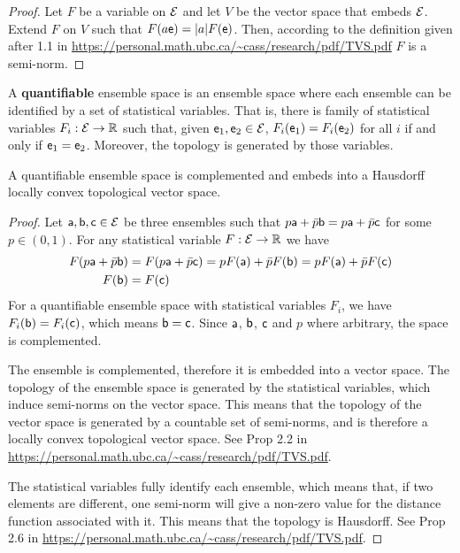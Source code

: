 \begin{proof}
	Let $F$ be a variable on $\Ens$ and let $V$ be the vector space that embeds $\Ens$. Extend $F$ on $V$ such that $F(a\ens) = |a| F(\ens)$. Then, according to the definition given after 1.1 in \url{https://personal.math.ubc.ca/~cass/research/pdf/TVS.pdf} $F$ is a semi-norm.
\end{proof}

\begin{defn}
	A \textbf{quantifiable} ensemble space is an ensemble space where each ensemble can be identified by a set of statistical variables. That is, there is family of statistical variables $F_i : \Ens \to \mathbb{R}$ such that, given $\ens_1, \ens_2 \in \Ens$, $F_i(\ens_1) = F_i(\ens_2)$ for all $i$ if and only if $\ens_1 = \ens_2$. Moreover, the topology is generated by those variables.
\end{defn}

\begin{prop}
	A quantifiable ensemble space is complemented and embeds into a Hausdorff locally convex topological vector space.
\end{prop}

\begin{proof}
	Let $\ens[a], \ens[b], \ens[c] \in \Ens$ be three ensembles such that $p \ens[a] + \bar{p} \ens[b] = p \ens[a] + \bar{p} \ens[c]$ for some $p \in (0,1)$. For any statistical variable $F : \Ens \to \mathbb{R}$ we have
	\begin{equation}
		\begin{aligned}
			F(p \ens[a] + \bar{p} \ens[b]) &= F(p \ens[a] + \bar{p} \ens[c]) = p F(\ens[a]) + \bar{p} F(\ens[b]) = p F(\ens[a]) + \bar{p} F(\ens[c])\\
			F(\ens[b]) &= F(\ens[c]) 
		\end{aligned}
	\end{equation}
	For a quantifiable ensemble space with statistical variables $F_i$, we have $F_i(\ens[b]) = F_i(\ens[c])$, which means $\ens[b] = \ens[c]$. Since $\ens[a]$, $\ens[b]$, $\ens[c]$ and $p$ where arbitrary, the space is complemented.
	
	The ensemble is complemented, therefore it is embedded into a vector space. The topology of the ensemble space is generated by the statistical variables, which induce semi-norms on the vector space. This means that the topology of the vector space is generated by a countable set of semi-norms, and is therefore a locally convex topological vector space. See Prop 2.2 in \url{https://personal.math.ubc.ca/~cass/research/pdf/TVS.pdf}.
	
	The statistical variables fully identify each ensemble, which means that, if two elements are different, one semi-norm will give a non-zero value for the distance function associated with it. This means that the topology is Hausdorff. See Prop 2.6 in \url{https://personal.math.ubc.ca/~cass/research/pdf/TVS.pdf}.
\end{proof}

